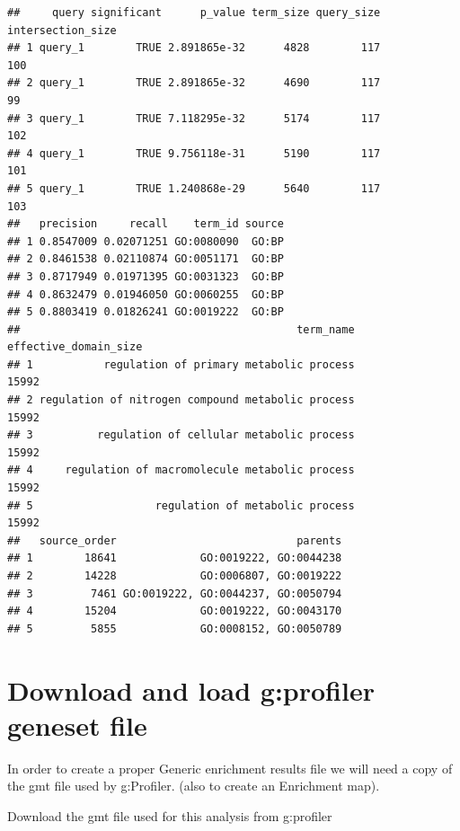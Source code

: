 \documentclass[
]{book}
\begin{document}
\begin{verbatim}
##     query significant      p_value term_size query_size intersection_size
## 1 query_1        TRUE 2.891865e-32      4828        117               100
## 2 query_1        TRUE 2.891865e-32      4690        117                99
## 3 query_1        TRUE 7.118295e-32      5174        117               102
## 4 query_1        TRUE 9.756118e-31      5190        117               101
## 5 query_1        TRUE 1.240868e-29      5640        117               103
##   precision     recall    term_id source
## 1 0.8547009 0.02071251 GO:0080090  GO:BP
## 2 0.8461538 0.02110874 GO:0051171  GO:BP
## 3 0.8717949 0.01971395 GO:0031323  GO:BP
## 4 0.8632479 0.01946050 GO:0060255  GO:BP
## 5 0.8803419 0.01826241 GO:0019222  GO:BP
##                                           term_name effective_domain_size
## 1           regulation of primary metabolic process                 15992
## 2 regulation of nitrogen compound metabolic process                 15992
## 3          regulation of cellular metabolic process                 15992
## 4     regulation of macromolecule metabolic process                 15992
## 5                   regulation of metabolic process                 15992
##   source_order                            parents
## 1        18641             GO:0019222, GO:0044238
## 2        14228             GO:0006807, GO:0019222
## 3         7461 GO:0019222, GO:0044237, GO:0050794
## 4        15204             GO:0019222, GO:0043170
## 5         5855             GO:0008152, GO:0050789
\end{verbatim}

\hypertarget{download-and-load-gprofiler-geneset-file}{%
\section{Download and load g:profiler geneset file}\label{download-and-load-gprofiler-geneset-file}}

In order to create a proper Generic enrichment results file we will need a copy of the gmt file used by g:Profiler. (also to create an Enrichment map).

Download the gmt file used for this analysis from g:profiler
\end{document}
